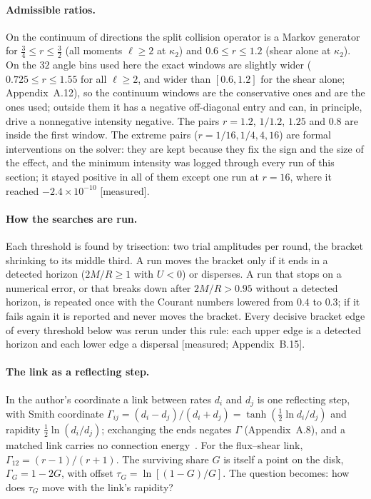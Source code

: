 \documentclass[11pt]{article}
\newcommand{\grade}[1]{\textsf{\small[#1]}}
\begin{document}
\paragraph{Admissible ratios.} On the continuum of directions the split collision operator is a Markov generator for $\tfrac34\le r\le\tfrac32$ (all moments $\ell\ge2$ at $\kappa_2$) and $0.6\le r\le1.2$ (shear alone at $\kappa_2$). On the $32$ angle bins used here the exact windows are slightly wider ($0.725\le r\le1.55$ for all $\ell\ge2$, and wider than $[0.6,1.2]$ for the shear alone; Appendix~A.12), so the continuum windows are the conservative ones and are the ones used; outside them it has a negative off-diagonal entry and can, in principle, drive a nonnegative intensity negative. The pairs $r=1.2$, $1/1.2$, $1.25$ and $0.8$ are inside the first window. The extreme pairs ($r=1/16,1/4,4,16$) are formal interventions on the solver: they are kept because they fix the sign and the size of the effect, and the minimum intensity was logged through every run of this section; it stayed positive in all of them except one run at $r=16$, where it reached $-2.4\times10^{-10}$ \grade{measured}.

\paragraph{How the searches are run.} Each threshold is found by trisection: two trial amplitudes per round, the bracket shrinking to its middle third. A run moves the bracket only if it ends in a detected horizon ($2M/R\ge1$ with $U<0$) or disperses. A run that stops on a numerical error, or that breaks down after $2M/R>0.95$ without a detected horizon, is repeated once with the Courant numbers lowered from $0.4$ to $0.3$; if it fails again it is reported and never moves the bracket. Every decisive bracket edge of every threshold below was rerun under this rule: each upper edge is a detected horizon and each lower edge a dispersal \grade{measured; Appendix~B.15}.

\paragraph{The link as a reflecting step.} In the author's coordinate a link between rates $d_i$ and $d_j$ is one reflecting step, with Smith coordinate $\Gamma_{ij}=(d_i-d_j)/(d_i+d_j)=\tanh(\tfrac12\ln d_i/d_j)$ and rapidity $\tfrac12\ln(d_i/d_j)$; exchanging the ends negates $\Gamma$ (Appendix~A.8), and a matched link carries no connection energy~\cite{CE}. For the flux--shear link, $\Gamma_{12}=(r-1)/(r+1)$. The surviving share $G$ is itself a point on the disk, $\Gamma_G=1-2G$, with offset $\tau_G=\ln[(1-G)/G]$. The question becomes: how does $\tau_G$ move with the link's rapidity?
\end{document}
